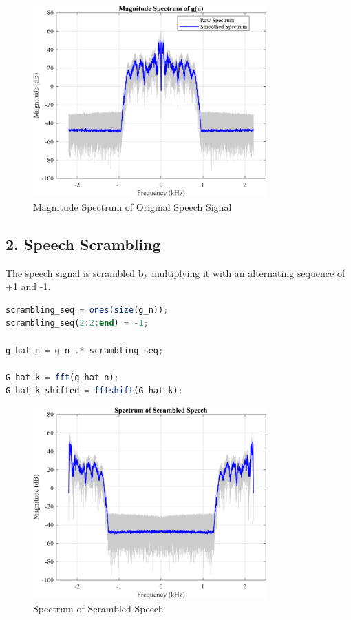 \documentclass[12pt]{article}
\begin{document}
\begin{figure}[H]
    \centering
    \includegraphics[width=0.8\textwidth]{G_k.png}
    \caption{Magnitude Spectrum of Original Speech Signal}
\end{figure}


\newpage
\subsection*{2. Speech Scrambling}
The speech signal is scrambled by multiplying it with an alternating sequence of +1 and -1. 

\begin{lstlisting}[language=Octave, caption=FFT of Hilbert Sequence]
scrambling_seq = ones(size(g_n));
scrambling_seq(2:2:end) = -1;

g_hat_n = g_n .* scrambling_seq;

G_hat_k = fft(g_hat_n);
G_hat_k_shifted = fftshift(G_hat_k);
\end{lstlisting}

\begin{figure}[H]
    \centering
    \includegraphics[width=0.8\textwidth]{G_hat_k.png}
    \caption{Spectrum of Scrambled Speech}
\end{figure}
\end{document}
